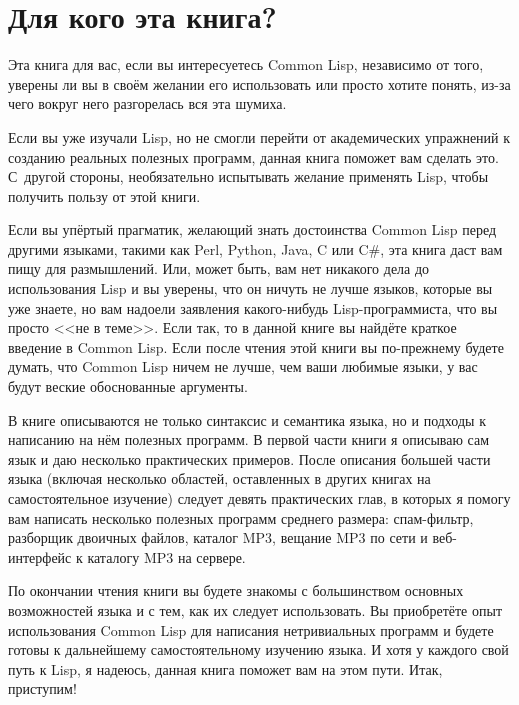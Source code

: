 \section{Для кого эта книга?}

Эта книга для вас, если вы интересуетесь Common Lisp, независимо от
того, уверены ли вы в своём желании его использовать или просто хотите понять,
из-за чего вокруг него разгорелась вся эта шумиха.

Если вы уже изучали Lisp, но не смогли перейти от академических упражнений к созданию
реальных полезных программ, данная книга поможет вам сделать это. С~другой
стороны, необязательно испытывать желание применять Lisp, чтобы получить пользу от этой
книги.

Если вы упёртый прагматик, желающий знать достоинства Common Lisp перед другими языками,
такими как Perl, Python, Java, C или C\#, эта книга даст вам пищу для размышлений.
Или, может быть, вам нет никакого дела до использования Lisp и вы уверены, что он
ничуть не лучше языков, которые вы уже знаете, но вам надоели заявления какого-нибудь
Lisp-программиста, что вы просто <<не в теме>>. Если так, то в данной книге вы
найдёте краткое введение в Common Lisp. Если после чтения этой книги вы по-прежнему будете
думать, что Common Lisp ничем не лучше, чем ваши любимые языки, у вас будут веские
обоснованные аргументы.

В книге описываются не только синтаксис и семантика языка, но и подходы к написанию на
нём полезных программ. В первой части книги я описываю сам язык и даю несколько
практических примеров. После описания большей части языка (включая несколько областей,
оставленных в других книгах на самостоятельное изучение) следует девять практических глав,
в которых я помогу вам написать несколько полезных программ среднего размера: спам-фильтр,
разборщик двоичных файлов, каталог MP3, вещание MP3 по сети и веб-интерфейс к каталогу MP3 на
сервере.

По окончании чтения книги вы будете знакомы с большинством основных возможностей языка
и с тем, как их следует использовать. Вы приобретёте опыт использования Common Lisp для
написания нетривиальных программ и будете готовы к дальнейшему самостоятельному изучению
языка. И хотя у каждого свой путь к Lisp, я надеюсь, данная книга поможет вам на этом
пути. Итак, приступим!


